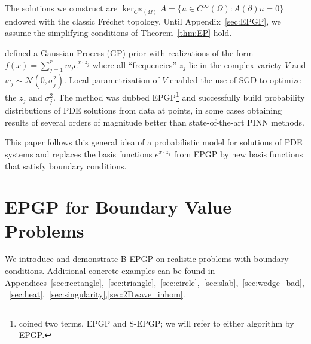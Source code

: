 \documentclass{article} %
\theoremstyle{plain}
\theoremstyle{definition}
\theoremstyle{remark}
\begin{document}
The solutions we construct  are $\ker_{C^\infty(\Omega)}A=\{u\in C^\infty(\Omega)\colon A(\partial)u=0\}$ endowed with the classic Fr\'echet topology. Until Appendix~\ref{sec:EPGP}, we assume the simplifying conditions of Theorem~\ref{thm:EP} hold.

\citep{harkonen2023gaussian} defined a Gaussian Process (GP) prior with realizations of the form
$
f(x)=\sum_{j=1}^r w_je^{x\cdot z_j}
$
where all ``frequencies'' $z_j$ lie in the complex variety $V$ and $w_j\sim\mathcal{N}(0,\sigma_j^2)$. Local parametrization of $V$ enabled the use of SGD to optimize the $z_j$ and $\sigma_j^2$. The method was dubbed EPGP\footnote{\citep{harkonen2023gaussian} coined two terms, EPGP and S-EPGP; we will refer to either algorithm by EPGP.} and  successfully build probability distributions of PDE solutions from data at points, in some cases obtaining results of several orders of magnitude better than state-of-the-art PINN methods.

This paper follows this general idea of a probabilistic model for solutions of PDE systems and replaces the basis functions $e^{x\cdot z_j}$ from EPGP by new basis functions that satisfy boundary conditions.

\section{EPGP for Boundary Value Problems}\label{sec:B-EPGP}


We introduce and demonstrate B-EPGP on realistic problems with boundary conditions. Additional concrete examples  can be found in  Appendices~\ref{sec:rectangle},~\ref{sec:triangle},~\ref{sec:circle},~\ref{sec:slab},~\ref{sec:wedge_bad},~\ref{sec:heat},~\ref{sec:singularity},\ref{sec:2Dwave_inhom}.
\end{document}
